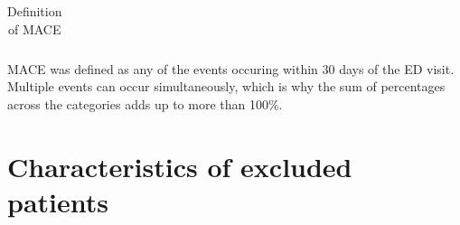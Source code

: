 \documentclass[preprint]{elsarticle}
\begin{document}
\begin{table}[H]
\begin{adjustbox}{center}
\begin{tabular}{@{}p{3.1cm}lrr@{}}
\bottomrule
\end{tabular}
\end{adjustbox}
\caption{Definition of MACE}
\medskip
\small
MACE was defined as any of the events occuring within 30 days of the ED visit. Multiple events can occur simultaneously, which is why the sum of percentages across the categories adds up to more than 100\%.
\label{table:appendix:mace}
\end{table}
\renewcommand{\arraystretch}{1}


\section{Characteristics of excluded patients}
\label{sec:appendix:characteristics}

\renewcommand{\arraystretch}{1.2}
\begin{table}[H]
  \centering
  \begin{footnotesize}
\begin{tabular}{@{}lr@{}}
  \toprule


\end{tabular}
\end{footnotesize}
\end{table}
\end{document}
